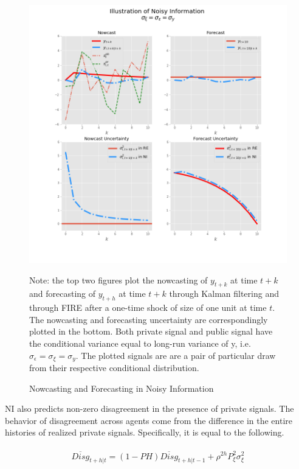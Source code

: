 \documentclass[12pt]{article}
\begin{document}
	\begin{figure}[p]
		\centering
		\includegraphics[width=13cm]{figures/ni_illustration.png}  \\
		\begin{flushleft}
		{\footnotesize Note: the top two figures plot the nowcasting of $y_{t+k}$  at time $t+k$ and forecasting of $y_{t+h}$ at time $t+k$ through Kalman filtering and through FIRE after a one-time shock of size of one unit at time $t$. The nowcasting and forecasting uncertainty are correspondingly plotted in the bottom. Both private signal and public signal have the conditional variance equal to long-run variance of y, i.e.  $\sigma_\epsilon = \sigma_\xi = \sigma_y$. The plotted signals are are a pair of particular draw from their respective conditional distribution. }
		\end{flushleft}
		\caption{Nowcasting and Forecasting in Noisy Information}
		\label{IllustrateNI}
	\end{figure}
	
	NI also predicts non-zero disagreement in the presence of private signals. The behavior of disagreement across agents come from the difference in the entire histories of realized private signals. Specifically, it is equal to the following. 
	
	\begin{eqnarray}
		\begin{aligned}
			\overline {Disg}_{t+h|t} =  (1-PH) \overline {Disg}_{t+h|t-1} + \rho^{2h} P^2_\xi \sigma^2_\xi 
		\end{aligned}
	\end{eqnarray}
	
\end{document}
